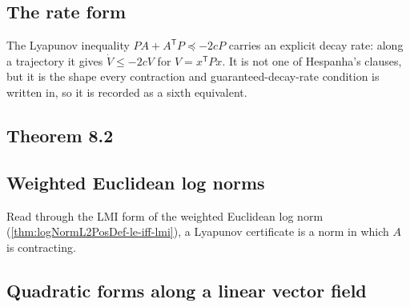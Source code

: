 



\subsection{The rate form}

The Lyapunov inequality $PA + A^{\mathsf T}P \preceq -2cP$ carries an explicit decay rate:
along a trajectory it gives $\dot V \le -2cV$ for $V = x^{\mathsf T}Px$. It is not one of
Hespanha's clauses, but it is the shape every contraction and guaranteed-decay-rate condition
is written in, so it is recorded as a sixth equivalent.



\subsection{Theorem 8.2}





\subsection{Weighted Euclidean log norms}

Read through the LMI form of the weighted Euclidean log norm
(\cref{thm:logNormL2PosDef-le-iff-lmi}), a Lyapunov certificate is a norm in which $A$ is
contracting.



\subsection{Quadratic forms along a linear vector field}

